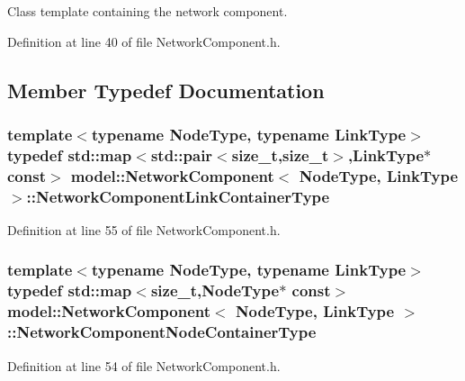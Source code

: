 Class template containing the network component. 

Definition at line 40 of file Network\+Component.\+h.



\subsection{Member Typedef Documentation}
\hypertarget{classmodel_1_1_network_component_aa1d6608e9d5d47df3af19dc5d16ab1c9}{}
\subsubsection[{Network\+Component\+Link\+Container\+Type}]{\setlength{\rightskip}{0pt plus 5cm}template$<$typename Node\+Type, typename Link\+Type$>$ typedef std\+::map$<$std\+::pair$<$size\+\_\+t,size\+\_\+t$>$,{\bf Link\+Type}$\ast$ const$>$ {\bf model\+::\+Network\+Component}$<$ {\bf Node\+Type}, {\bf Link\+Type} $>$\+::{\bf Network\+Component\+Link\+Container\+Type}}\label{classmodel_1_1_network_component_aa1d6608e9d5d47df3af19dc5d16ab1c9}


Definition at line 55 of file Network\+Component.\+h.

\hypertarget{classmodel_1_1_network_component_a5cc5556926889ad7063ecddceb7b23fc}{}
\subsubsection[{Network\+Component\+Node\+Container\+Type}]{\setlength{\rightskip}{0pt plus 5cm}template$<$typename Node\+Type, typename Link\+Type$>$ typedef std\+::map$<$size\+\_\+t,{\bf Node\+Type}$\ast$ const$>$ {\bf model\+::\+Network\+Component}$<$ {\bf Node\+Type}, {\bf Link\+Type} $>$\+::{\bf Network\+Component\+Node\+Container\+Type}}\label{classmodel_1_1_network_component_a5cc5556926889ad7063ecddceb7b23fc}


Definition at line 54 of file Network\+Component.\+h.



